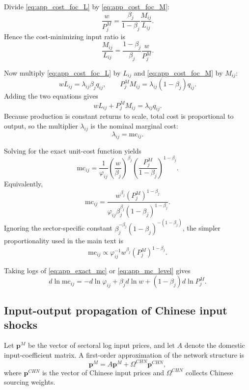 Divide \eqref{eq:app_cost_foc_L} by \eqref{eq:app_cost_foc_M}:
\[
\frac{w}{P_j^M}
=
\frac{\beta_j}{1-\beta_j}
\frac{M_{ij}}{L_{ij}}.
\]
Hence the cost-minimizing input ratio is
\begin{equation}
\frac{M_{ij}}{L_{ij}}
=
\frac{1-\beta_j}{\beta_j} \frac{w}{P_j^M}.
\label{eq:app_input_ratio}
\end{equation}

Now multiply \eqref{eq:app_cost_foc_L} by $L_{ij}$ and \eqref{eq:app_cost_foc_M} by $M_{ij}$:
\[
w L_{ij}
=
\lambda_{ij} \beta_j q_{ij},
\qquad
P_j^M M_{ij}
=
\lambda_{ij} (1-\beta_j) q_{ij}.
\]
Adding the two equations gives
\[
w L_{ij} + P_j^M M_{ij} = \lambda_{ij} q_{ij}.
\]
Because production is constant returns to scale, total cost is proportional to output, so the multiplier $\lambda_{ij}$ is the nominal marginal cost:
\[
\lambda_{ij} = \text{mc}_{ij}.
\]

Solving for the exact unit-cost function yields
\begin{equation}
\text{mc}_{ij}
=
\frac{1}{\varphi_{ij}}
\left( \frac{w}{\beta_j} \right)^{\beta_j}
\left( \frac{P_j^M}{1-\beta_j} \right)^{1-\beta_j}.
\label{eq:app_exact_mc}
\end{equation}
Equivalently,
\[
\text{mc}_{ij}
=
\frac{w^{\beta_j} (P_j^M)^{1-\beta_j}}
{\varphi_{ij} \beta_j^{\beta_j} (1-\beta_j)^{1-\beta_j}}.
\]
Ignoring the sector-specific constant $\beta_j^{-\beta_j} (1-\beta_j)^{-(1-\beta_j)}$, the simpler proportionality used in the main text is
\begin{equation}
\text{mc}_{ij} \propto \varphi_{ij}^{-1} w^{\beta_j} (P_j^M)^{1-\beta_j}.
\label{eq:app_mc_level}
\end{equation}

Taking logs of \eqref{eq:app_exact_mc} or \eqref{eq:app_mc_level} gives
\begin{equation}
d \ln \text{mc}_{ij}
=
- d \ln \varphi_{ij}
+ \beta_j d \ln w
+ (1-\beta_j) d \ln P_j^M.
\label{eq:app_mc_growth}
\end{equation}

\subsection{Input-output propagation of Chinese input shocks}

Let $\mathbf{p}^M$ be the vector of sectoral log input prices, and let $A$ denote the domestic input-coefficient matrix. A first-order approximation of the network structure is
\[
\mathbf{p}^M = A \mathbf{p}^M + \Omega^{CHN} \mathbf{p}^{CHN},
\]
where $\mathbf{p}^{CHN}$ is the vector of Chinese input prices and $\Omega^{CHN}$ collects Chinese sourcing weights.

